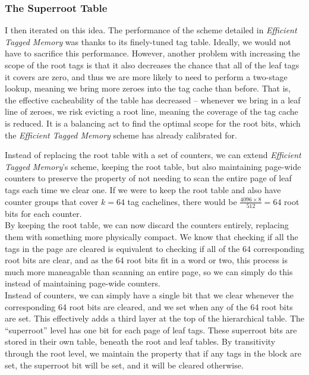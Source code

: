 \subsubsection{The Superroot Table}
I then iterated on this idea. The performance of the scheme detailed in \textit{Efficient Tagged Memory} was thanks to its finely-tuned tag table. Ideally, we would not have to sacrifice this performance. However, another problem with increasing the scope of the root tags is that it also decreases the chance that all of the leaf tags it covers are zero, and thus we are more likely to need to perform a two-stage lookup, meaning we bring more zeroes into the tag cache than before. That is, the effective cacheability of the table has decreased -- whenever we bring in a leaf line of zeroes, we risk evicting a root line, meaning the coverage of the tag cache is reduced. It is a balancing act to find the optimal scope for the root bits, which the \textit{Efficient Tagged Memory} scheme has already calibrated for.

Instead of replacing the root table with a set of counters, we can extend \textit{Efficient Tagged Memory}'s scheme, keeping the root table, but also maintaining page-wide counters to preserve the property of not needing to scan the entire page of leaf tags each time we clear one. If we were to keep the root table and also have counter groups that cover $k=64$ tag cachelines, there would be $\frac{4096 \times 8}{512} = 64$ root bits for each counter.\\
By keeping the root table, we can now discard the counters entirely, replacing them with something more physically compact. We know that checking if all the tags in the page are cleared is equivalent to checking if all of the 64 corresponding root bits are clear, and as the 64 root bits fit in a word or two, this process is much more maneagable than scanning an entire page, so we can simply do this instead of maintaining page-wide counters.\\
Instead of counters, we can simply have a single bit that we clear whenever the corresponding 64 root bits are cleared, and we set when any of the 64 root bits are set. This effectively adds a third layer at the top of the hierarchical table. The ``superroot'' level has one bit for each page of leaf tags. These superroot bits are stored in their own table, beneath the root and leaf tables. By transitivity through the root level, we maintain the property that if any tags in the block are set, the superroot bit will be set, and it will be cleared otherwise.

